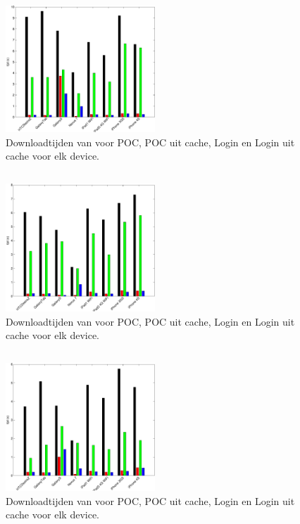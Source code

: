 \subsection{\kendo}

\begin{figure}
  \centering
  \includegraphics[width=0.5\textwidth]{figuren/performance-kendo.pdf}
  \caption{Downloadtijden van \kendo{} voor POC,  POC uit cache,  Login en Login uit cache voor elk device.}
  \label{fig:performantie-kendo}
\end{figure}

\subsection{\jqm}

\begin{figure}
  \centering
  \includegraphics[width=0.5\textwidth]{figuren/performance-jquery.pdf}
  \caption{Downloadtijden van \jqm{} voor POC,  POC uit cache,  Login en Login uit cache voor elk device.}
  \label{fig:performantie-jqm}
\end{figure}

\subsection{\lungo}

\begin{figure}
  \centering
  \includegraphics[width=0.5\textwidth]{figuren/performance-lungo.pdf}
  \caption{Downloadtijden van \lungo{} voor POC,  POC uit cache,  Login en Login uit cache voor elk device.}
  \label{fig:performantie-lungo}
\end{figure}
